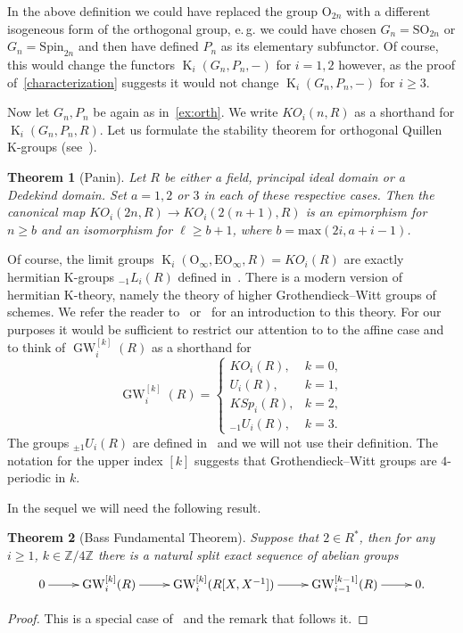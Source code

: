 \documentclass[oneside, 8pt]{amsart}
\newtheorem{theorem}{Theorem}
\theoremstyle{remark}
\theoremstyle{definition}
\DeclareMathOperator{\K}{K}
\DeclareMathOperator{\GW}{GW}
\newcommand{\ZZ}{\mathbb{Z}}
\numberwithin{equation}{section}
\begin{document}
In the above definition we could have replaced the group $\mathrm{O}_{2n}$ with a different isogeneous form of the orthogonal group, e.\,g. 
 we could have chosen $G_n = \mathrm{SO}_{2n}$ or $G_n = \mathrm{Spin}_{2n}$ and then have defined $P_n$ as its elementary subfunctor.
Of course, this would change the functors $\K_i(G_n, P_n, -)$ for $i=1,2$ however, as the proof of~\cref{characterization} suggests %
 it would not change $\K_i(G_n, P_n, -)$ for $i\geq 3$.

Now let $G_n, P_n$ be again as in~\cref{ex:orth}. We write $KO_i(n, R)$ as a shorthand for $\K_i(G_n, P_n, R)$.
Let us formulate the stability theorem for orthogonal Quillen K-groups (see~\cite[Theorem~9.4]{Pa89}).
\begin{theorem}[Panin] \label{lem:Panin-stability}
 Let $R$ be either a field, principal ideal domain or a Dedekind domain. Set $a = 1,2$ or $3$ in each of these respective cases.
 Then the canonical map $KO_i(2n, R) \to KO_i(2(n+1), R)$ is an epimorphism for $n \geq b$ 
 and an isomorphism for $\ell \geq b + 1$, where $b = \mathrm{max}(2i, a+i-1)$. \end{theorem}
 
Of course, the limit groups $\K_i(\mathrm{O}_\infty, \mathrm{EO}_\infty, R) = KO_i(R)$ are exactly hermitian K-groups ${}_{-1}\!L_i(R)$ defined in~\cite{Ka80}.
There is a modern version of hermitian K-theory, namely the theory of higher Grothendieck--Witt groups of schemes.
We refer the reader to~\cite[\S~2]{AF17} or~\cite[\S~2]{FRS12} for an introduction to this theory.
For our purposes it would be sufficient to restrict our attention to to the affine case and to think of $\GW_i^{[k]}(R)$ as a shorthand for
\begin{equation}
 \GW_i^{[k]}(R) = \left\{\begin{array}{ll} KO_i(R), & k = 0, \\ U_i(R), & k = 1, \\ KSp_i(R), & k = 2, \\ {}_{-1}\!U_i(R), & k = 3. \end{array}\right.
\end{equation} %
The groups ${}_{\pm 1}\!U_i(R)$ are defined in~\cite{Ka80} and we will not use their definition.
The notation for the upper index $[k]$ suggests that Grothendieck--Witt groups are $4$-periodic in $k$.


In the sequel we will need the following result.
\begin{theorem}[Bass Fundamental Theorem]\label{bass-ft} Suppose that $2 \in R^*$, then for any $i\geq 1$, $k\in \ZZ/4\ZZ$ there is a natural split exact sequence of abelian groups
 \[ \xymatrix{ 0 \ar[r] & \GW_i^{[k]}(R) \ar[r] & \GW_i^{[k]}(R[X, X^{-1}]) \ar[r]  & \GW_{i-1}^{[k-1]}(R) \ar[r] & 0.} \] \end{theorem}
\begin{proof} This is a special case of~\cite[Theorem~9.13]{Sch16} and the remark that follows it. \end{proof}
\end{document}
